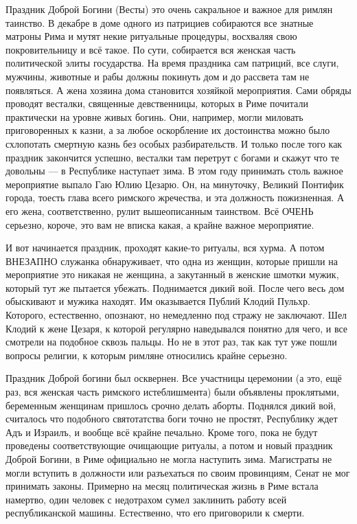 Праздник Доброй Богини (Весты) это очень сакральное и важное для римлян таинство. В декабре в доме одного из патрициев собираются все знатные матроны Рима и мутят некие ритуальные процедуры, восхваляя свою покровительницу и всё такое. По сути, собирается вся женская часть политической элиты государства. На время праздника сам патриций, все слуги, мужчины, животные и рабы должны покинуть дом и до рассвета там не появляться. А жена хозяина дома становится хозяйкой мероприятия. Сами обряды проводят весталки, священные девственницы, которых в Риме почитали практически на уровне живых богинь. Они, например, могли миловать приговоренных к казни, а за любое оскорбление их достоинства можно было схлопотать смертную казнь без особых разбирательств. И только после того как праздник закончится успешно, весталки там перетрут с богами и скажут что те довольны — в Республике наступает зима. В этом году принимать столь важное мероприятие выпало Гаю Юлию Цезарю. Он, на минуточку, Великий Понтифик города, тоесть глава всего римского жречества, и эта должность пожизненная. А его жена, соответственно, рулит вышеописанным таинством. Всё ОЧЕНЬ серьезно, короче, это вам не вписка какая, а крайне важное мероприятие.


И вот начинается праздник, проходят какие-то ритуалы, вся хурма. А потом ВНЕЗАПНО служанка обнаруживает, что одна из женщин, которые пришли на мероприятие это никакая не женщина, а закутанный в женские шмотки мужик, который тут же пытается убежать. Поднимается дикий вой. После чего весь дом обыскивают и мужика находят. Им оказывается Публий Клодий Пульхр. Которого, естественно, опознают, но немедленно под стражу не заключают. Шел Клодий к жене Цезаря, к которой регулярно наведывался понятно для чего, и все смотрели на подобное сквозь пальцы. Но не в этот раз, так как тут уже пошли вопросы религии, к которым римляне относились крайне серьезно.


Праздник Доброй богини был осквернен. Все участницы церемонии (а это, ещё раз, вся женская часть римского истеблишмента) были объявлены проклятыми, беременным женщинам пришлось срочно делать аборты. Поднялся дикий вой, считалось что подобного святотатства боги точно не простят, Республику ждет Адъ и Израилъ, и вообще всё крайне печально. Кроме того, пока не будут проведены соответствующие очищающие ритуалы, а потом и новый праздник Доброй Богини, в Риме официально не могла наступить зима. Магистраты не могли вступить в должности или разъехаться по своим провинциям, Сенат не мог принимать законы. Примерно на месяц политическая жизнь в Риме встала намертво, один человек с недотрахом сумел заклинить работу всей республиканской машины. Естественно, что его приговорили к смерти.


